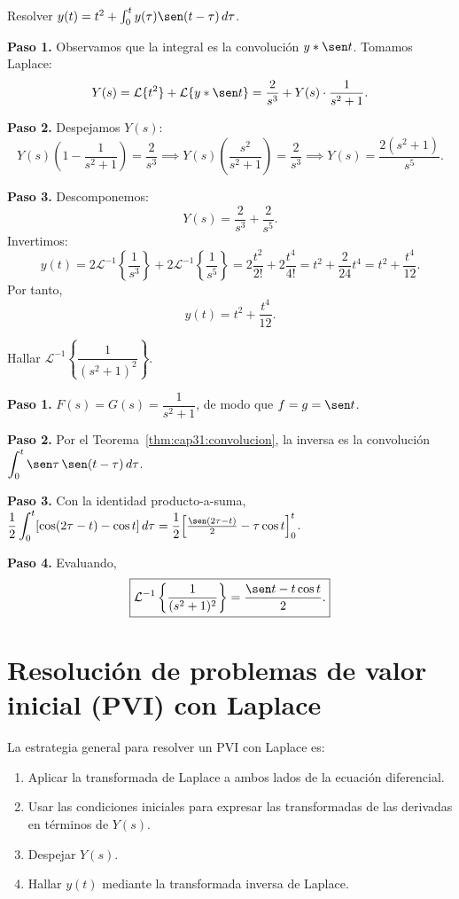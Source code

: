 \begin{example}
Resolver $y(t) = t^2 + \int_0^t y(\tau)\sen(t-\tau)\,d\tau$.
\begin{myproof}
\textbf{Paso 1.} Observamos que la integral es la convolución $y * \sen t$. Tomamos Laplace:
\[
Y(s) = \mathcal{L}\{t^2\} + \mathcal{L}\{y * \sen t\} = \frac{2}{s^3} + Y(s)\cdot \frac{1}{s^2+1}.
\]

\textbf{Paso 2.} Despejamos $Y(s)$:
\[
Y(s)\left(1 - \frac{1}{s^2+1}\right) = \frac{2}{s^3} \implies Y(s)\left(\frac{s^2}{s^2+1}\right) = \frac{2}{s^3} \implies Y(s) = \frac{2(s^2+1)}{s^5}.
\]

\textbf{Paso 3.} Descomponemos:
\[
Y(s) = \frac{2}{s^3} + \frac{2}{s^5}.
\]
Invertimos:
\[
y(t) = 2\mathcal{L}^{-1}\left\{\frac{1}{s^3}\right\} + 2\mathcal{L}^{-1}\left\{\frac{1}{s^5}\right\}
= 2\frac{t^2}{2!} + 2\frac{t^4}{4!} = t^2 + \frac{2}{24}t^4 = t^2 + \frac{t^4}{12}.
\]
Por tanto,
\[
\boxed{y(t) = t^2 + \frac{t^4}{12}.}
\]
\end{myproof}
\end{example}

\begin{example}
Hallar $\mathcal{L}^{-1}\left\{\dfrac{1}{(s^2+1)^2}\right\}$.
\begin{myproof}
\textbf{Paso 1.} $F(s)=G(s)=\dfrac{1}{s^2+1}$, de modo que $f=g=\sen t$.

\textbf{Paso 2.} Por el Teorema~\ref{thm:cap31:convolucion}, la inversa es la convolución $\displaystyle\int_0^t \sen\tau\,\sen(t-\tau)\,d\tau$.

\textbf{Paso 3.} Con la identidad producto-a-suma, $\dfrac{1}{2}\displaystyle\int_0^t[\cos(2\tau-t)-\cos t]\,d\tau=\dfrac{1}{2}\Big[\tfrac{\sen(2\tau-t)}{2}-\tau\cos t\Big]_0^t$.

\textbf{Paso 4.} Evaluando,
\[
\boxed{\mathcal{L}^{-1}\left\{\frac{1}{(s^2+1)^2}\right\}=\frac{\sen t-t\cos t}{2}.}
\]
\end{myproof}
\end{example}

\section{Resolución de problemas de valor inicial (PVI) con Laplace}

\begin{rem}
La estrategia general para resolver un PVI con Laplace es:
\begin{enumerate}
\item Aplicar la transformada de Laplace a ambos lados de la ecuación diferencial.
\item Usar las condiciones iniciales para expresar las transformadas de las derivadas en términos de $Y(s)$.
\item Despejar $Y(s)$.
\item Hallar $y(t)$ mediante la transformada inversa de Laplace.
\end{enumerate}
\end{rem}

